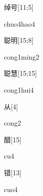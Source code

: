 \begin{verbete}{绰号}[11;5]
\begin{pronuncia}{chuo4hao4}
\end{pronuncia}
\end{verbete}

\begin{verbete}{聪明}[15;8]
\begin{pronuncia}{cong1ming2}
\end{pronuncia}
\end{verbete}

\begin{verbete}{聪慧}[15;15]
\begin{pronuncia}{cong1hui4}
\end{pronuncia}
\end{verbete}

\begin{verbete}[cong2]{从}[4]
\begin{pronuncia}{cong2}
\end{pronuncia}
\end{verbete}

\begin{verbete}[cu4]{醋}[15]
\begin{pronuncia}{cu4}
\end{pronuncia}
\end{verbete}

\begin{verbete}[cuo4]{错}[13]
\begin{pronuncia}{cuo4}
\end{pronuncia}
\end{verbete}

